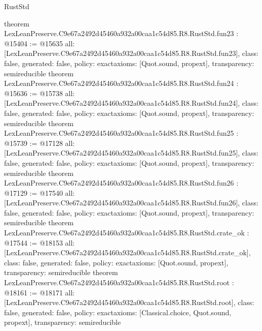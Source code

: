 \begin{lexlean}{RustStd}
\begin{coremodule}
{}
theorem LexLeanPreserve.C9e67a2492d45460a932a00caa1c54d85.R8.RustStd.fun23 : @15404 := @15635 {
  all: [LexLeanPreserve.C9e67a2492d45460a932a00caa1c54d85.R8.RustStd.fun23],
  class: false,
  generated: false,
  policy: exact{axioms: [Quot.sound, propext]},
  transparency: semireducible
}
theorem LexLeanPreserve.C9e67a2492d45460a932a00caa1c54d85.R8.RustStd.fun24 : @15636 := @15738 {
  all: [LexLeanPreserve.C9e67a2492d45460a932a00caa1c54d85.R8.RustStd.fun24],
  class: false,
  generated: false,
  policy: exact{axioms: [Quot.sound, propext]},
  transparency: semireducible
}
theorem LexLeanPreserve.C9e67a2492d45460a932a00caa1c54d85.R8.RustStd.fun25 : @15739 := @17128 {
  all: [LexLeanPreserve.C9e67a2492d45460a932a00caa1c54d85.R8.RustStd.fun25],
  class: false,
  generated: false,
  policy: exact{axioms: [Quot.sound, propext]},
  transparency: semireducible
}
theorem LexLeanPreserve.C9e67a2492d45460a932a00caa1c54d85.R8.RustStd.fun26 : @17129 := @17540 {
  all: [LexLeanPreserve.C9e67a2492d45460a932a00caa1c54d85.R8.RustStd.fun26],
  class: false,
  generated: false,
  policy: exact{axioms: [Quot.sound, propext]},
  transparency: semireducible
}
theorem LexLeanPreserve.C9e67a2492d45460a932a00caa1c54d85.R8.RustStd.crate_ok : @17544 := @18153 {
  all: [LexLeanPreserve.C9e67a2492d45460a932a00caa1c54d85.R8.RustStd.crate_ok],
  class: false,
  generated: false,
  policy: exact{axioms: [Quot.sound, propext]},
  transparency: semireducible
}
theorem LexLeanPreserve.C9e67a2492d45460a932a00caa1c54d85.R8.RustStd.root : @18161 := @18171 {
  all: [LexLeanPreserve.C9e67a2492d45460a932a00caa1c54d85.R8.RustStd.root],
  class: false,
  generated: false,
  policy: exact{axioms: [Classical.choice, Quot.sound, propext]},
  transparency: semireducible
}


\end{coremodule}
\end{lexlean}
